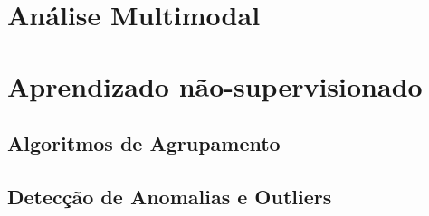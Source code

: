 \section{Análise Multimodal}

\section{Aprendizado não-supervisionado}

\subsection{Algoritmos de Agrupamento}


\subsection{Detecção de Anomalias e Outliers}

